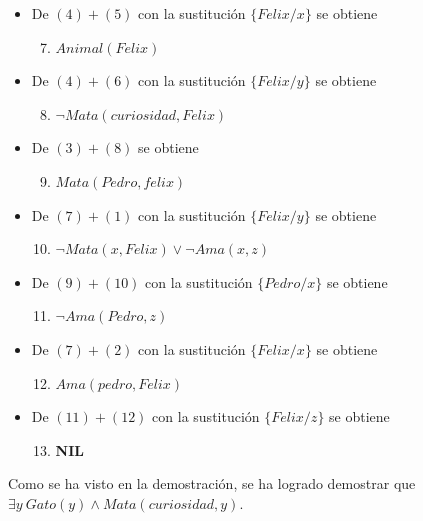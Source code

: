 \documentclass[12pt]{article} %
\begin{document}
\begin{itemize}
\item De $(4)+(5)$ con la sustitución $\{Felix/x\}$ se obtiene

\begin{enumerate}
	\setcounter{enumi}{6}
	\item $Animal(Felix)$
\end{enumerate}

\item De $(4)+(6)$ con la sustitución $\{Felix/y\}$ se obtiene
\begin{enumerate}
	\setcounter{enumi}{7}
	\item $\neg Mata(curiosidad,Felix)$
\end{enumerate}

\item De $(3)+(8)$ se obtiene

\begin{enumerate}
	\setcounter{enumi}{8}
	\item $Mata(Pedro,felix)$
\end{enumerate}

\item De $(7)+(1)$ con la sustitución $\{Felix/y\}$ se obtiene
\begin{enumerate}
	\setcounter{enumi}{9}
	\item $\neg Mata(x,Felix)\vee\neg Ama(x,z)$
\end{enumerate}

\item De $(9)+(10)$ con la sustitución $\{Pedro/x\}$ se obtiene
\begin{enumerate}
	\setcounter{enumi}{10}
	\item $\neg Ama(Pedro,z)$
\end{enumerate}

\item De $(7)+(2)$ con la sustitución $\{Felix/x\}$ se obtiene
\begin{enumerate}
	\setcounter{enumi}{11}
	\item $Ama(pedro,Felix)$
\end{enumerate}
\item De $(11)+(12)$ con la sustitución $\{Felix/z\}$ se obtiene
\begin{enumerate}
	\setcounter{enumi}{12}
	\item \textbf{NIL}
\end{enumerate}
\end{itemize}

\par Como se ha visto en la demostración, se ha logrado demostrar que $\exists y \  Gato(y) \wedge Mata(curiosidad,y)$.
\end{document}
